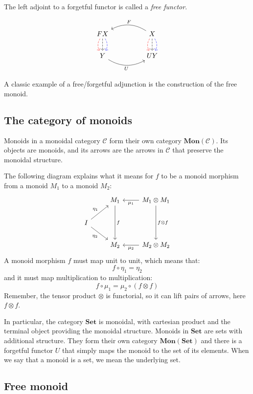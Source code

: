 \documentclass[DaoFP]{subfiles}
\begin{document}
The left adjoint to a forgetful functor is called a \emph{free functor}.

\[
 \begin{tikzcd}
F X
\arrow[d, bend right, red, dashed]
\arrow[d, dashed]
\arrow[d, bend left, blue, dashed]
  &&
  X
\arrow[d, bend right, red, dashed]
\arrow[d, dashed]
\arrow[d, bend left, blue, dashed]
 \arrow[ll, bend right, "F"']
 \\
Y
   \arrow[rr, bend right, "U"']
 &&
 U Y
  \end{tikzcd}
\]

A classic example of a free/forgetful adjunction is the construction of the free monoid.


\subsection{The category of monoids}
Monoids in a monoidal category $\mathcal{C}$ form their own category $\mathbf{Mon}(\mathcal{C})$. Its objects are monoids, and its arrows are the arrows in $\mathcal{C}$ that preserve the monoidal structure. 

The following diagram explains what it means for $f$ to be a monoid morphism from a monoid $M_1$ to a monoid $M_2$:
\[
 \begin{tikzcd}
 & M_1
 \arrow[dd, "f"]
 & M_1 \otimes M_1
 \arrow[l, "\mu_1"]
 \arrow[dd, "f \otimes f"]
 \\
 I
 \arrow[ru, "\eta_1"]
 \arrow[rd, "\eta_2"']
 \\
 & M_2
 & M_2 \otimes M_2
 \arrow[l, "\mu_2"]
  \end{tikzcd}
\]
A monoid morphism $f$ must map unit to unit, which means that:
\[ f \circ \eta_1 = \eta_2 \]
and it must map multiplication to multiplication:
\[ f \circ \mu_1 = \mu_2 \circ (f \otimes f)\]
Remember, the tensor product $\otimes$ is functorial, so it can lift pairs of arrows, here $f \otimes f$.

In particular, the category $\mathbf{Set}$ is monoidal, with cartesian product and the terminal object providing the monoidal structure. Monoids in $\mathbf{Set}$ are sets with additional structure. They form their own category $\mathbf{Mon}(\mathbf{Set})$ and there is a forgetful functor $U$ that simply maps the monoid to the set of its elements. When we say that a monoid is a set, we mean the underlying set.

\subsection{Free monoid}
\end{document}

